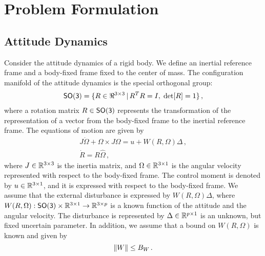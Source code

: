 \documentclass[letterpaper, 10 pt, conference]{ieeeconf}  %
\begin{document}
\section{Problem Formulation}\label{sec:prob_form}
\subsection{Attitude Dynamics}\label{sec:att_dyn}
Consider the attitude dynamics of a rigid body. 
We define an inertial reference frame and a body-fixed frame fixed to the center of mass. 
The configuration manifold of the attitude dynamics is the special orthogonal group:
\begin{align*}
	\mathsf{SO(3)} = \{R\in\Re^{3\times 3}\,|\, R^TR=I,\;\mathrm{det}[R]=1\} \, ,
\end{align*}
where a rotation matrix $R\in\mathsf{SO(3)}$ represents the transformation of the representation of a vector from the body-fixed frame to the inertial reference frame. 
The equations of motion are given by
\begin{gather}
	J\dot\Omega + \Omega\times J\Omega = u+W(R,\Omega)\Delta \, ,\label{eqn:Wdot}\\
	\dot R = R\hat\Omega \, ,\label{eqn:Rdot}
\end{gather}
where $J\in\mathbb{R}^{3\times 3}$ is the inertia matrix, and $\Omega\in\mathbb{R}^{3\times1}$ is the angular velocity represented with respect to the body-fixed frame. 
The control moment is denoted by $u\in\mathbb{R}^{3\times1}$, and it is expressed with respect to the body-fixed frame. 
We assume that the external disturbance is expressed by $W(R,\Omega)\Delta$, where $W(R,\Omega):\mathsf{SO(3)}\times\mathbb{R}^{3\times1}\rightarrow \mathbb{R}^{3\times p}$ is a known function of the attitude and the angular velocity.
The disturbance is represented by $\Delta\in\mathbb{R}^{p\times1}$ is an unknown, but fixed uncertain parameter.
In addition, we assume that a bound on \( W(R, \Omega) \) is known and given by
\begin{equation}
	\left\| W \right\| \leq B_W \, . \label{eqn:W_bound}
\end{equation}
\end{document}
